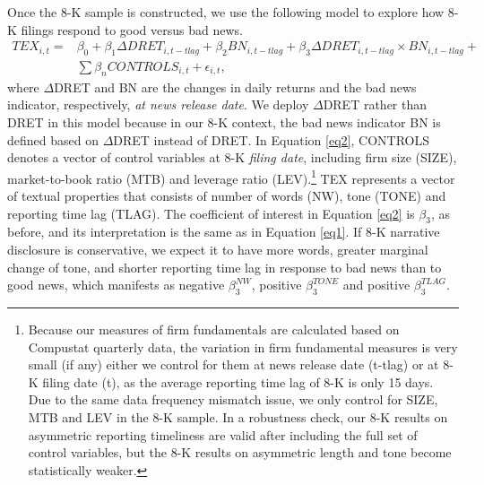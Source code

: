 \documentclass[letterpaper,12pt]{article}
\begin{document}
\begin{spacing}{1.5}
Once the 8-K sample is constructed, we use the following model to explore how 8-K filings respond to good versus bad news.
\begin{equation}
\begin{aligned}
\label{eq2}
TEX_{i,t}=
&\beta_0+\beta_1\Delta DRET_{i,t-tlag}+\beta_2BN_{i,t-tlag}+\beta_3\Delta DRET_{i,t-tlag}\times BN_{i,t-tlag}+\\
&\sum\beta_nCONTROLS_{i,t}+\epsilon_{i,t},
\end{aligned}
\end{equation}
where $\Delta$DRET and BN are the changes in daily returns and the bad news indicator, respectively, \textit{at news release date}. We deploy $\Delta$DRET rather than DRET in this model because in our 8-K context, the bad news indicator BN is defined based on $\Delta$DRET instead of DRET. In Equation \eqref{eq2}, CONTROLS denotes a vector of control variables at 8-K \textit{filing date}, including firm size (SIZE), market-to-book ratio (MTB) and leverage ratio (LEV).\footnote{Because our measures of firm fundamentals are calculated based on Compustat quarterly data, the variation in firm fundamental measures is very small (if any) either we control for them at news release date (t-tlag) or at 8-K filing date (t), as the average reporting time lag of 8-K is only 15 days. Due to the same data frequency mismatch issue, we only control for SIZE, MTB and LEV in the 8-K sample. In a robustness check, our 8-K results on asymmetric reporting timeliness are valid after including the full set of control variables, but the 8-K results on asymmetric length and tone become statistically weaker.} TEX represents a vector of textual properties that consists of number of words (NW), tone (TONE) and reporting time lag (TLAG). The coefficient of interest in Equation \eqref{eq2} is $\beta_3$, as before, and its interpretation is the same as in Equation \eqref{eq1}. If 8-K narrative disclosure is conservative, we expect it to have more words, greater marginal change of tone, and shorter reporting time lag in response to bad news than to good news, which manifests as negative $\beta_3^{NW}$, positive  $\beta_3^{TONE}$ and positive $\beta_3^{TLAG}$.


\end{spacing}
\end{document}
